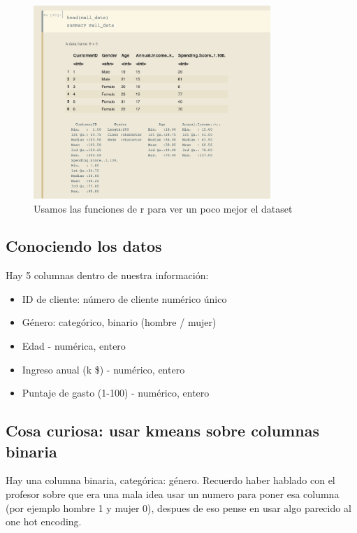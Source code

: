 \documentclass[12pt, fleqn]{report}                             %
\theoremstyle{break}                                            %
\begin{document}
                \begin{figure}[ht!]
                    \centering
                    \includegraphics[width=0.8\textwidth]{3}
                    \caption{Usamos las funciones de r para ver un poco mejor el dataset}
                \end{figure}

                \clearpage

            \subsection{Conociendo los datos}

                Hay 5 columnas dentro de nuestra información:

                \begin{itemize}
                    \item ID de cliente: número de cliente numérico único
                    \item Género: categórico, binario (hombre / mujer)
                    \item Edad - numérica, entero
                    \item Ingreso anual (k \$) - numérico, entero
                    \item Puntaje de gasto (1-100) - numérico, entero
                \end{itemize}

            \subsection{Cosa curiosa: usar kmeans sobre columnas binaria}

            Hay una columna binaria, categórica: género.
            Recuerdo haber hablado con el profesor sobre que era una mala idea usar un numero para poner esa columna
            (por ejemplo hombre 1 y mujer 0), despues de eso pense en usar algo parecido al one hot encoding.
            
\end{document}
